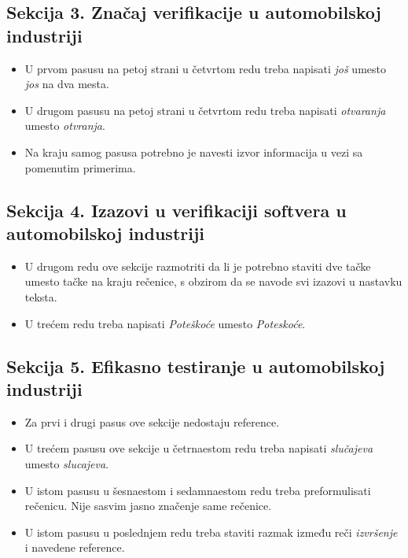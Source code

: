 \documentclass[a4paper]{report}
\begin{document}
\subsection{Sekcija 3. Značaj verifikacije u automobilskoj industriji}

\begin{itemize}
\item U prvom pasusu na petoj strani u četvrtom redu treba napisati \textit{još} umesto \textit{jos} na dva mesta.

\item U drugom pasusu na petoj strani u četvrtom redu treba napisati \textit{otvaranja} umesto \textit{otvranja}.

\item Na kraju samog pasusa potrebno je navesti izvor informacija u vezi sa pomenutim primerima.

\end{itemize}

\subsection{Sekcija 4. Izazovi u verifikaciji softvera u automobilskoj industriji}

\begin{itemize}

\item U drugom redu ove sekcije razmotriti da li je potrebno staviti dve tačke umesto tačke na kraju rečenice, s obzirom da se navode svi izazovi u nastavku teksta.

\item U trećem redu treba napisati \textit{Poteškoće} umesto \textit{Poteskoće}.

\end{itemize}



\subsection{Sekcija 5. Efikasno testiranje u automobilskoj industriji}

\begin{itemize}

\item Za prvi i drugi pasus ove sekcije nedostaju reference. 

\item U trećem pasusu ove sekcije u četrnaestom redu treba napisati \textit{slučajeva} umesto \textit{slucajeva}.

\item U istom pasusu u šesnaestom i sedamnaestom redu treba preformulisati rečenicu. Nije sasvim jasno značenje same rečenice.

\item U istom pasusu u poslednjem redu treba staviti razmak između reči \textit{izvršenje} i navedene reference.

\end{itemize}
\end{document}
